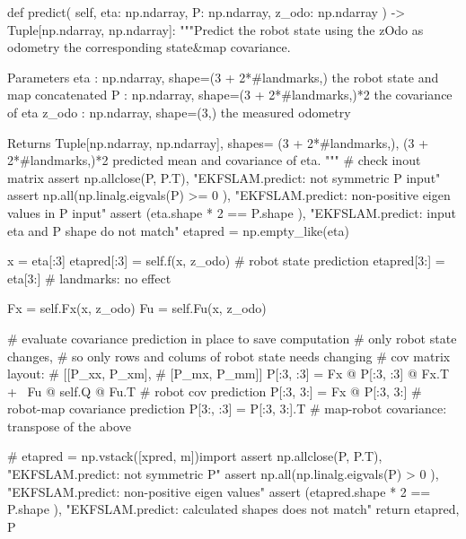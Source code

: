 \begin{pythoncode}
def predict(
    self, eta: np.ndarray, P: np.ndarray, z_odo: np.ndarray
) -> Tuple[np.ndarray, np.ndarray]:
    """Predict the robot state using the zOdo as odometry the corresponding 
    state&map covariance.

    Parameters
    eta : np.ndarray, shape=(3 + 2*#landmarks,)
    the robot state and map concatenated
    P : np.ndarray, shape=(3 + 2*#landmarks,)*2
    the covariance of eta
    z_odo : np.ndarray, shape=(3,)
    the measured odometry

    Returns
    Tuple[np.ndarray, np.ndarray], shapes= (3 + 2*#landmarks,), 
    (3 + 2*#landmarks,)*2
    predicted mean and covariance of eta.
    """
    # check inout matrix
    assert np.allclose(P, P.T), "EKFSLAM.predict: not symmetric P input"
    assert np.all(np.linalg.eigvals(P) >= 0
        ), "EKFSLAM.predict: non-positive eigen values in P input"
    assert (eta.shape * 2 == P.shape
        ), "EKFSLAM.predict: input eta and P shape do not match"
    etapred = np.empty_like(eta)

    x = eta[:3]
    etapred[:3] = self.f(x, z_odo)  # robot state prediction
    etapred[3:] = eta[3:]  # landmarks: no effect

    Fx = self.Fx(x, z_odo)
    Fu = self.Fu(x, z_odo)

    # evaluate covariance prediction in place to save computation
    # only robot state changes, 
    # so only rows and colums of robot state needs changing
    # cov matrix layout:
    # [[P_xx, P_xm],
    # [P_mx, P_mm]]
    P[:3, :3] = Fx @ P[:3, :3] @ Fx.T + \
            Fu @ self.Q @ Fu.T  # robot cov prediction
    P[:3, 3:] = Fx @ P[:3, 3:]  # robot-map covariance prediction
    P[3:, :3] = P[:3, 3:].T  # map-robot covariance: transpose of the above

    # etapred = np.vstack([xpred, m])import
    assert np.allclose(P, P.T), "EKFSLAM.predict: not symmetric P"
    assert np.all(np.linalg.eigvals(P) > 0
        ), "EKFSLAM.predict: non-positive eigen values"
    assert (etapred.shape * 2 == P.shape
        ), "EKFSLAM.predict: calculated shapes does not match"
    return etapred, P
\end{pythoncode}